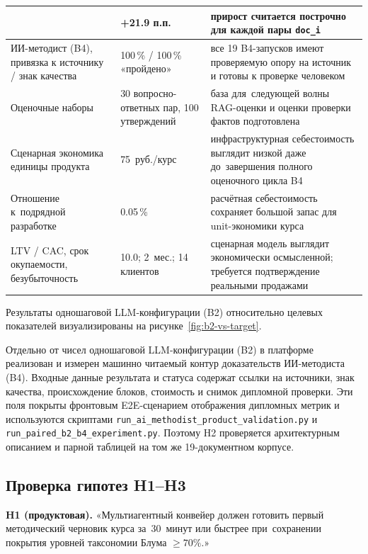 \begin{longtable}{|P{3.7cm}|P{2.5cm}|P{6.2cm}|}
    & +21.9 п.п.
    & прирост считается построчно для каждой пары \texttt{doc\_i} \\
  \hline
  ИИ-методист (B4), привязка к источнику / знак качества
    & 100\,\% / 100\,\% «пройдено»
    & все 19 B4-запусков имеют проверяемую опору на источник
      и готовы к проверке человеком \\
  \hline
  Оценочные наборы
    & 30 вопросно-ответных пар, 100 утверждений
    & база для~следующей волны RAG-оценки и оценки проверки фактов подготовлена \\
  \hline
  Сценарная экономика единицы продукта
    & 75~руб./курс
    & инфраструктурная себестоимость выглядит низкой даже до~завершения
      полного оценочного цикла B4 \\
  \hline
  Отношение к~подрядной разработке
    & 0.05\,\%
    & расчётная себестоимость сохраняет большой запас для unit-экономики
      курса \\
  \hline
  LTV / CAC, срок окупаемости, безубыточность
    & 10.0; 2~мес.; 14 клиентов
    & сценарная модель выглядит экономически осмысленной; требуется
      подтверждение реальными продажами \\
  \hline
  \end{longtable}
\endgroup

Результаты одношаговой LLM-конфигурации (B2) относительно
целевых показателей визуализированы на рисунке~\ref{fig:b2-vs-target}.



Отдельно от чисел одношаговой LLM-конфигурации (B2) в платформе реализован
и измерен машинно читаемый контур доказательств ИИ-методиста (B4).
Входные данные результата и статуса содержат
ссылки на источники, знак качества, происхождение блоков,
стоимость и снимок дипломной проверки. Эти поля
покрыты фронтовым E2E-сценарием отображения дипломных метрик и
используются скриптами \texttt{run\_ai\_methodist\_product\_validation.py}
и \texttt{run\_paired\_b2\_b4\_experiment.py}. Поэтому H2 проверяется
архитектурным описанием и парной таблицей на том же 19-документном корпусе.

\subsection{Проверка гипотез H1–H3}

\textbf{H1 (продуктовая).}
«Мультиагентный конвейер должен готовить первый методический
черновик курса за~30~минут или быстрее
при~сохранении покрытия уровней таксономии Блума $\geq 70\%$.»

